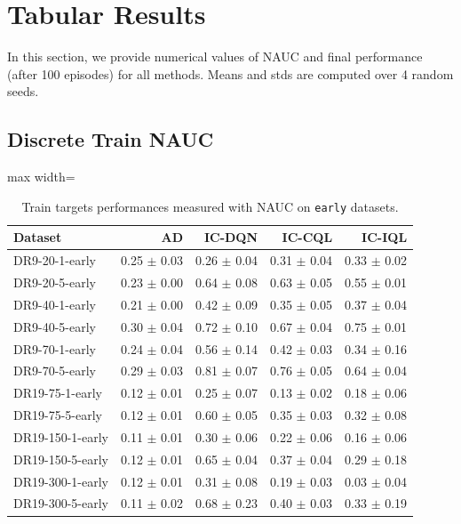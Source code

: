 \documentclass{article}
\begin{document}
\section{Tabular Results}
\label{app:tables}
In this section, we provide numerical values of NAUC and final performance (after 100 episodes) for all methods.  Means and stds are computed over 4 random seeds.
\subsection{Discrete Train NAUC}
\begin{table}[ht]
    \label{tab:}
    \begin{center}
    \caption{Train targets performances measured with NAUC on \texttt{early} datasets.}
    \begin{small}
    \begin{adjustbox}{max width=\columnwidth}
		\begin{tabular}{l|rrrr}
		\toprule
	\textbf{Dataset} & \textbf{AD} & \textbf{IC-DQN} & \textbf{IC-CQL} & \textbf{IC-IQL}\\
\midrule
DR9-20-1-early & 0.25 $\pm$ 0.03 & 0.26 $\pm$ 0.04 & 0.31 $\pm$ 0.04 & 0.33 $\pm$ 0.02\\
DR9-20-5-early & 0.23 $\pm$ 0.00 & 0.64 $\pm$ 0.08 & 0.63 $\pm$ 0.05 & 0.55 $\pm$ 0.01\\
DR9-40-1-early & 0.21 $\pm$ 0.00 & 0.42 $\pm$ 0.09 & 0.35 $\pm$ 0.05 & 0.37 $\pm$ 0.04\\
DR9-40-5-early & 0.30 $\pm$ 0.04 & 0.72 $\pm$ 0.10 & 0.67 $\pm$ 0.04 & 0.75 $\pm$ 0.01\\
DR9-70-1-early & 0.24 $\pm$ 0.04 & 0.56 $\pm$ 0.14 & 0.42 $\pm$ 0.03 & 0.34 $\pm$ 0.16\\
DR9-70-5-early & 0.29 $\pm$ 0.03 & 0.81 $\pm$ 0.07 & 0.76 $\pm$ 0.05 & 0.64 $\pm$ 0.04\\
DR19-75-1-early & 0.12 $\pm$ 0.01 & 0.25 $\pm$ 0.07 & 0.13 $\pm$ 0.02 & 0.18 $\pm$ 0.06\\
DR19-75-5-early & 0.12 $\pm$ 0.01 & 0.60 $\pm$ 0.05 & 0.35 $\pm$ 0.03 & 0.32 $\pm$ 0.08\\
DR19-150-1-early & 0.11 $\pm$ 0.01 & 0.30 $\pm$ 0.06 & 0.22 $\pm$ 0.06 & 0.16 $\pm$ 0.06\\
DR19-150-5-early & 0.12 $\pm$ 0.01 & 0.65 $\pm$ 0.04 & 0.37 $\pm$ 0.04 & 0.29 $\pm$ 0.18\\
DR19-300-1-early & 0.12 $\pm$ 0.01 & 0.31 $\pm$ 0.08 & 0.19 $\pm$ 0.03 & 0.03 $\pm$ 0.04\\
DR19-300-5-early & 0.11 $\pm$ 0.02 & 0.68 $\pm$ 0.23 & 0.40 $\pm$ 0.03 & 0.33 $\pm$ 0.19\\

\end{tabular}
\end{adjustbox}
\end{small}
\end{center}
\end{table}
\end{document}
